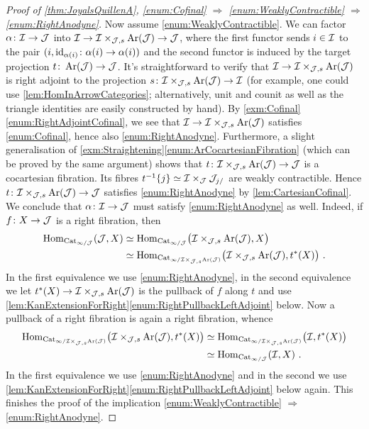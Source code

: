 \begin{proof}[Proof of \cref{thm:JoyalsQuillenA}, \cref{enum:Cofinal}  $\Rightarrow$ \cref{enum:WeaklyContractible} $\Rightarrow$ \cref{enum:RightAnodyne}]
	Now assume \cref{enum:WeaklyContractible}. We can factor $\alpha\colon \mathcal{I}\rightarrow \mathcal{J}$ into $\mathcal{I}\rightarrow \mathcal{I}\times_{\mathcal{J},s}\operatorname{Ar}(\mathcal{J})\rightarrow \mathcal{J}$, where the first functor sends $i\in \mathcal{I}$ to the pair $(i,\operatorname{id}_{\alpha(i)}\colon \alpha(i)\rightarrow \alpha(i))$ and the second functor is induced by the target projection $t\colon \operatorname{Ar}(\mathcal{J})\rightarrow \mathcal{J}$. It's straightforward to verify that $\mathcal{I}\rightarrow \mathcal{I}\times_{\mathcal{J},s}\operatorname{Ar}(\mathcal{J})$ is right adjoint to the projection $s\colon \mathcal{I}\times_{\mathcal{J},s}\operatorname{Ar}(\mathcal{J})\rightarrow \mathcal{I}$ (for example, one could use \cref{lem:HomInArrowCategories}; alternatively, unit and counit as well as the triangle identities are easily constructed by hand). By \cref{exm:Cofinal}\cref{enum:RightAdjointCofinal}, we see that $\mathcal{I}\rightarrow \mathcal{I}\times_{\mathcal{J},s}\operatorname{Ar}(\mathcal{J})$ satisfies \cref{enum:Cofinal}, hence also \cref{enum:RightAnodyne}. Furthermore, a slight generalisation of \cref{exm:Straightening}\cref{enum:ArCocartesianFibration} (which can be proved by the same argument) shows that $t\colon\mathcal{I}\times_{\mathcal{J},s}\operatorname{Ar}(\mathcal{J})\rightarrow \mathcal{J}$ is a cocartesian fibration. Its fibres $t^{-1}\{j\}\simeq \mathcal{I}\times_{\mathcal{J}} \mathcal{J}_{j/}$ are weakly contractible. Hence $t\colon\mathcal{I}\times_{\mathcal{J},s}\operatorname{Ar}(\mathcal{J})\rightarrow \mathcal{J}$ satisfies \cref{enum:RightAnodyne} by \cref{lem:CartesianCofinal}. We conclude that $\alpha\colon \mathcal{I}\rightarrow \mathcal{J}$ must satisfy \cref{enum:RightAnodyne} as well. Indeed, if $f\colon X\rightarrow \mathcal{J}$ is a right fibration, then
	\begin{align*}
		\Hom_{\Cat_{\infty/\Jj}}\!\left(\Jj,X\right)&\simeq \Hom_{\Cat_{\infty/\Jj}}\lef(\Ii\times_{\Jj,s}\Ar(\Jj),X\righ)\\
		&\simeq  \Hom_{\Cat_{\infty/\Ii\times_{\Jj,s}\Ar(\Jj)}}\lef(\Ii\times_{\Jj,s}\Ar(\Jj),t^*(X)\righ)\,.
	\end{align*}
	In the first equivalence we use \cref{enum:RightAnodyne}, in the second equivalence we let $t^*(X)\rightarrow \mathcal{I}\times_{\mathcal{J},s}\operatorname{Ar}(\mathcal{J})$ is the pullback of $f$ along $t$ and use \cref{lem:KanExtensionForRight}\cref{enum:RightPullbackLeftAdjoint} below. Now a pullback of a right fibration is again a right fibration, whence
	\begin{align*}
		\Hom_{\Cat_{\infty/\Ii\times_{\Jj,s}\Ar(\Jj)}}\lef(\Ii\times_{\Jj,s}\Ar(\Jj),t^*(X)\righ)&\simeq \Hom_{\Cat_{\infty/\Ii\times_{\Jj,s}\Ar(\Jj)}}\lef(\Ii,t^*(X)\righ)\\
		&\simeq \Hom_{\Cat_{\infty/\Jj}}\!\left(\Ii,X\right)\,.
	\end{align*}
	In the first equivalence we use \cref{enum:RightAnodyne} and in the second we use \cref{lem:KanExtensionForRight}\cref{enum:RightPullbackLeftAdjoint} below again. This finishes the proof of the implication \cref{enum:WeaklyContractible} $\Rightarrow$ \cref{enum:RightAnodyne}.
\end{proof}
